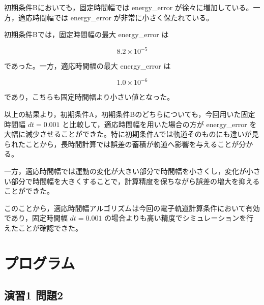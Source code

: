 \documentclass[uplatex,dvipdfmx]{jsarticle}
\begin{document}
初期条件Bにおいても，固定時間幅では energy\_error が徐々に増加している。一方，適応時間幅では energy\_error が非常に小さく保たれている。

初期条件Bでは，固定時間幅の最大 energy\_error は

\[
8.2\times10^{-5}
\]

であった。一方，適応時間幅の最大 energy\_error は

\[
1.0\times10^{-6}
\]

であり，こちらも固定時間幅より小さい値となった。

以上の結果より，初期条件A，初期条件Bのどちらについても，今回用いた固定時間幅 $dt=0.001$ と比較して，適応時間幅を用いた場合の方が energy\_error を大幅に減少させることができた。特に初期条件Aでは軌道そのものにも違いが見られたことから，長時間計算では誤差の蓄積が軌道へ影響を与えることが分かる。

一方，適応時間幅では運動の変化が大きい部分で時間幅を小さくし，変化が小さい部分で時間幅を大きくすることで，計算精度を保ちながら誤差の増大を抑えることができた。

このことから，適応時間幅アルゴリズムは今回の電子軌道計算条件において有効であり，固定時間幅 $dt=0.001$ の場合よりも高い精度でシミュレーションを行えたことが確認できた。

\section{プログラム}

\subsection{演習1 問題2}
\end{document}
